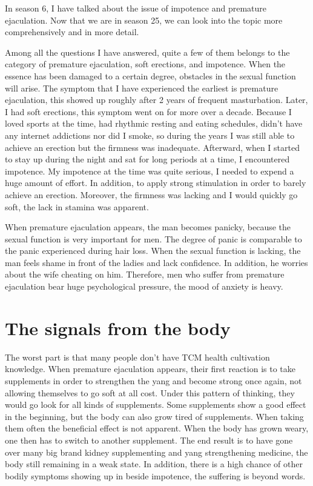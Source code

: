 \documentclass[
]{book}
\begin{document}
In season 6, I have talked about the issue of impotence and premature ejaculation. Now that we are in season 25, we can look into the topic more comprehensively and in more detail.

Among all the questions I have answered, quite a few of them belongs to the category of premature ejaculation, soft erections, and impotence. When the essence has been damaged to a certain degree, obstacles in the sexual function will arise. The symptom that I have experienced the earliest is premature ejaculation, this showed up roughly after 2 years of frequent masturbation. Later, I had soft erections, this symptom went on for more over a decade. Because I loved sports at the time, had rhythmic resting and eating schedules, didn't have any internet addictions nor did I smoke, so during the years I was still able to achieve an erection but the firmness was inadequate. Afterward, when I started to stay up during the night and sat for long periods at a time, I encountered impotence. My impotence at the time was quite serious, I needed to expend a huge amount of effort. In addition, to apply strong stimulation in order to barely achieve an erection. Moreover, the firmness was lacking and I would quickly go soft, the lack in stamina was apparent.

When premature ejaculation appears, the man becomes panicky, because the sexual function is very important for men. The degree of panic is comparable to the panic experienced during hair loss. When the sexual function is lacking, the man feels shame in front of the ladies and lack confidence. In addition, he worries about the wife cheating on him. Therefore, men who suffer from premature ejaculation bear huge psychological pressure, the mood of anxiety is heavy.

\hypertarget{the-signals-from-the-body}{%
\section{The signals from the body}\label{the-signals-from-the-body}}

The worst part is that many people don't have TCM health cultivation knowledge. When premature ejaculation appears, their first reaction is to take supplements in order to strengthen the yang and become strong once again, not allowing themselves to go soft at all cost. Under this pattern of thinking, they would go look for all kinds of supplements. Some supplements show a good effect in the beginning, but the body can also grow tired of supplements. When taking them often the beneficial effect is not apparent. When the body has grown weary, one then has to switch to another supplement. The end result is to have gone over many big brand kidney supplementing and yang strengthening medicine, the body still remaining in a weak state. In addition, there is a high chance of other bodily symptoms showing up in beside impotence, the suffering is beyond words.
\end{document}
